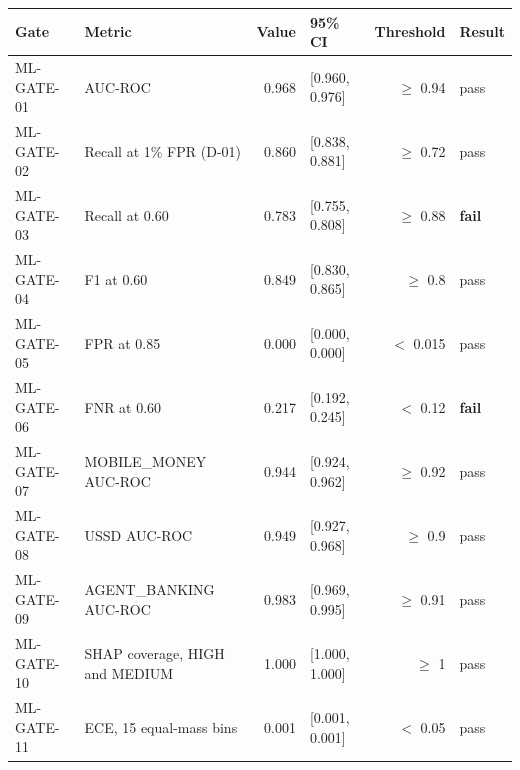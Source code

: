 \begin{tabular}{llrlrl}
\toprule
Gate & Metric & Value & 95\% CI & Threshold & Result \\
\midrule
ML-GATE-01 & AUC-ROC & 0.968 & [0.960, 0.976] & $\geq$ 0.94 & pass \\
ML-GATE-02 & Recall at 1\% FPR (D-01) & 0.860 & [0.838, 0.881] & $\geq$ 0.72 & pass \\
ML-GATE-03 & Recall at 0.60 & 0.783 & [0.755, 0.808] & $\geq$ 0.88 & \textbf{fail} \\
ML-GATE-04 & F1 at 0.60 & 0.849 & [0.830, 0.865] & $\geq$ 0.8 & pass \\
ML-GATE-05 & FPR at 0.85 & 0.000 & [0.000, 0.000] & $<$ 0.015 & pass \\
ML-GATE-06 & FNR at 0.60 & 0.217 & [0.192, 0.245] & $<$ 0.12 & \textbf{fail} \\
ML-GATE-07 & MOBILE_MONEY AUC-ROC & 0.944 & [0.924, 0.962] & $\geq$ 0.92 & pass \\
ML-GATE-08 & USSD AUC-ROC & 0.949 & [0.927, 0.968] & $\geq$ 0.9 & pass \\
ML-GATE-09 & AGENT_BANKING AUC-ROC & 0.983 & [0.969, 0.995] & $\geq$ 0.91 & pass \\
ML-GATE-10 & SHAP coverage, HIGH and MEDIUM & 1.000 & [1.000, 1.000] & $\geq$ 1 & pass \\
ML-GATE-11 & ECE, 15 equal-mass bins & 0.001 & [0.001, 0.001] & $<$ 0.05 & pass \\
\bottomrule
\end{tabular}
